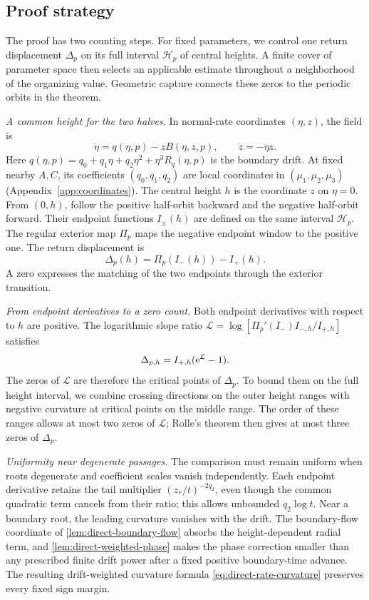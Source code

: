 \subsection*{Proof strategy}

The proof has two counting steps. For fixed parameters, we control
one return displacement \(\Delta_p\) on its full interval
\(\mathcal H_p\) of central heights. A finite cover of parameter
space then selects an applicable estimate throughout a neighborhood
of the organizing value. Geometric capture connects these zeros to
the periodic orbits in the theorem.

\emph{A common height for the two halves.}
In normal-rate coordinates \((\eta,z)\), the field is
\[
 \dot\eta=q(\eta,p)-zB(\eta,z,p),\qquad \dot z=-\eta z.
\]
Here \(q(\eta,p)=q_0+q_1\eta+q_2\eta^2+\eta^3R_q(\eta,p)\)
is the boundary drift. At fixed nearby \(A,C\), its coefficients
\((q_0,q_1,q_2)\) are local coordinates in
\((\mu_1,\mu_2,\mu_3)\) (Appendix~\ref{app:coordinates}).
The central height \(h\) is the coordinate \(z\) on \(\eta=0\).
From \((0,h)\), follow the positive half-orbit backward and the negative
half-orbit forward. Their endpoint functions \(I_\pm(h)\) are defined
on the same interval \(\mathcal H_p\). The regular exterior map
\(\Pi_p\) maps the negative endpoint window to the positive one.
The return displacement is
\[
 \Delta_p(h)=\Pi_p(I_-(h))-I_+(h).
\]
A zero expresses the matching of the two endpoints through the exterior
transition.

\emph{From endpoint derivatives to a zero count.}
Both endpoint derivatives with respect to \(h\) are positive. The
logarithmic slope ratio
\(\mathcal L=\log[\Pi_p'(I_-)I_{-,h}/I_{+,h}]\) satisfies
\[
 \Delta_{p,h}=I_{+,h}(\mathrm e^{\mathcal L}-1).
\]
The zeros of \(\mathcal L\) are therefore the critical points of
\(\Delta_p\). To bound them on the full height interval, we combine
crossing directions on the outer height ranges with negative
curvature at critical points on the middle range. The order of these
ranges allows at most two zeros of \(\mathcal L\); Rolle's theorem
then gives at most three zeros of \(\Delta_p\).

\emph{Uniformity near degenerate passages.}
The comparison must remain uniform when roots degenerate and coefficient
scales vanish independently. Each endpoint derivative retains the tail
multiplier \((z_*/t)^{-2q_2}\), even though the common quadratic term
cancels from their ratio; this allows unbounded \(q_2\log t\).
Near a boundary root, the leading curvature vanishes with the drift.
The boundary-flow coordinate of \cref{lem:direct-boundary-flow}
absorbs the height-dependent radial term, and
\cref{lem:direct-weighted-phase} makes the phase correction smaller
than any prescribed finite drift power after a fixed positive
boundary-time advance. The resulting drift-weighted curvature formula
\eqref{eq:direct-rate-curvature} preserves every fixed sign margin.

